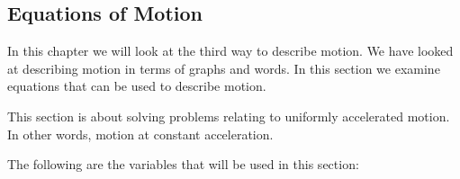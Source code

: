     
    
    
  
    \label{m38796*cid10}
            \subsection{ Equations of Motion}
            \nopagebreak
            
      
      \label{m38796*id75595}In this chapter we will look at the third way to describe motion. We have looked at describing motion in terms of graphs and words. In this section we examine equations that can be used to describe motion.\par 
      \label{m38796*id75600}This section is about solving problems relating to uniformly accelerated motion. In other words, motion at constant acceleration.\par 
      \label{m38796*id75605}The following are the variables that will be used in this section:\par 
      \label{m38796*id75611}\nopagebreak\noindent{}
